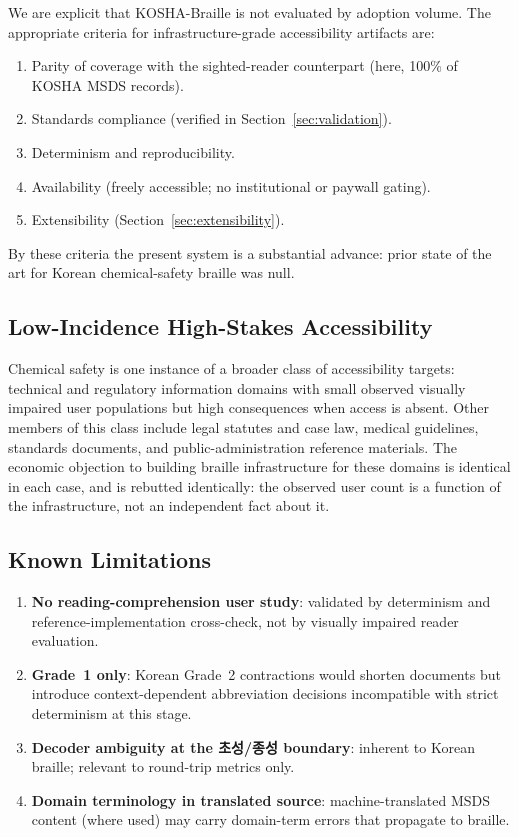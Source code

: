 \documentclass[journal]{IEEEtran}
\begin{document}
We are explicit that KOSHA-Braille is not evaluated by adoption volume. The appropriate criteria for infrastructure-grade accessibility artifacts are:

\begin{enumerate}
\item Parity of coverage with the sighted-reader counterpart (here, 100\% of KOSHA MSDS records).
\item Standards compliance (verified in Section~\ref{sec:validation}).
\item Determinism and reproducibility.
\item Availability (freely accessible; no institutional or paywall gating).
\item Extensibility (Section~\ref{sec:extensibility}).
\end{enumerate}

By these criteria the present system is a substantial advance: prior state of the art for Korean chemical-safety braille was null.

\subsection{Low-Incidence High-Stakes Accessibility}

Chemical safety is one instance of a broader class of accessibility targets: technical and regulatory information domains with small observed visually impaired user populations but high consequences when access is absent. Other members of this class include legal statutes and case law, medical guidelines, standards documents, and public-administration reference materials. The economic objection to building braille infrastructure for these domains is identical in each case, and is rebutted identically: the observed user count is a function of the infrastructure, not an independent fact about it.

\subsection{Known Limitations}

\begin{enumerate}
\item \textbf{No reading-comprehension user study}: validated by determinism and reference-implementation cross-check, not by visually impaired reader evaluation.
\item \textbf{Grade~1 only}: Korean Grade~2 contractions would shorten documents but introduce context-dependent abbreviation decisions incompatible with strict determinism at this stage.
\item \textbf{Decoder ambiguity at the 초성/종성 boundary}: inherent to Korean braille; relevant to round-trip metrics only.
\item \textbf{Domain terminology in translated source}: machine-translated MSDS content (where used) may carry domain-term errors that propagate to braille.
\end{enumerate}
\end{document}
